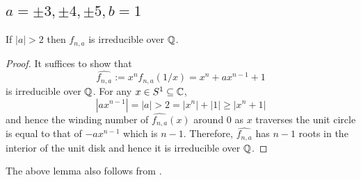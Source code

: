 \documentclass[../main.tex]{subfiles}
\begin{document}
\subsection{$a = \pm 3, \pm 4, \pm 5, b = 1$}
\begin{lemma}
  If $\left| a \right| > 2$ then $f_{n,a}$ is irreducible over $\mathbb{Q}$.
\end{lemma}
\begin{proof}
  It suffices to show that 
  \[
    \widehat{f_{n,a}} := x^n f_{n,a}\left( 1/x \right) = x^n + ax^{n-1} + 1 
  \]
  is irreducible over $\mathbb{Q}$.
  For any $x \in S^1 \subseteq \mathbb{C}$, 
  \[
    \left| a x^{n-1} \right| = \left| a \right| > 2 = \left|x^n\right| + \left|1\right| \geq \left|x^n + 1\right|  
  \]
  and hence the winding number of $\widehat{f_{n,a}}\left( x \right)$ around $0$ as $x$ traverses the unit circle is equal to that of $- a x^{n-1}$ which is $n-1$.
  Therefore, $\widehat{f_{n,a}}$ has $n-1$ roots in the interior of the unit disk and hence it is irreducible over $\mathbb{Q}$.
\end{proof}
\begin{remark}
  The above lemma also follows from \cite[Theorem 1]{Ljungren1960}.
\end{remark}
\end{document}
